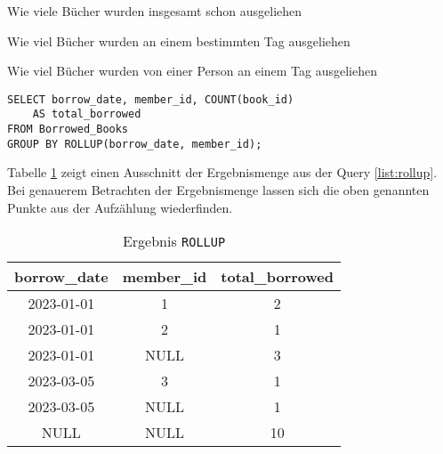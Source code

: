 \begin{description}
	\label{bul:aufzählung}

	\item[$\bullet$ 1. Punkt] Wie viele Bücher wurden insgesamt schon ausgeliehen

	\item[$\bullet$ 2. Punkt] Wie viel Bücher wurden an einem bestimmten Tag ausgeliehen

	\item[$\bullet$ 2. Punkt] Wie viel Bücher wurden von einer Person an einem Tag
		ausgeliehen
\end{description}

\begin{lstlisting}[caption={Beispiel eines ROLLUP}, label={list:rollup}]
SELECT borrow_date, member_id, COUNT(book_id)
	AS total_borrowed
FROM Borrowed_Books
GROUP BY ROLLUP(borrow_date, member_id);
\end{lstlisting}

Tabelle \ref{tab:rollup} zeigt einen Ausschnitt der Ergebnismenge aus der Query \ref{list:rollup}.
Bei genauerem Betrachten der Ergebnismenge lassen sich die oben genannten Punkte
aus der Aufzählung wiederfinden.

\begin{table}[h]
	\centering
	\begin{tabular}{|c|c|c|}
		\hline
		\textbf{borrow\_date} & \textbf{member\_id} & \textbf{total\_borrowed} \\
		\hline
		2023-01-01            & 1                   & 2                        \\ %
		\hline
		2023-01-01            & 2                   & 1                        \\ %
		\hline
		2023-01-01            & NULL                & 3                        \\ %
		\hline
		2023-03-05            & 3                   & 1                        \\
		\hline
		2023-03-05            & NULL                & 1                        \\
		\hline
		NULL                  & NULL                & 10                       \\
		\hline
	\end{tabular}
	\caption{Ergebnis \texttt{ROLLUP}}
	\label{tab:rollup}
\end{table}

